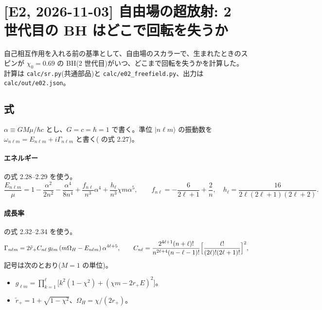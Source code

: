 \section{[E2, 2026-11-03] 自由場の超放射: 2 世代目の BH はどこで回転を失うか}\label{sec:e02}

自己相互作用を入れる前の基準として、自由場のスカラーで、生まれたときのスピンが $\chi_0=0.69$ の BH(2 世代目)がいつ、どこまで回転を失うかを計算した。計算は \texttt{calc/sr.py}(共通部品)と \texttt{calc/e02\_freefield.py}、出力は \texttt{calc/out/e02.json}。

\subsection{式}

$\alpha\equiv GM\mu/\hbar c$ とし、$G=c=\hbar=1$ で書く。準位 $|n\ell m\rangle$ の振動数を $\omega_{n\ell m}=E_{n\ell m}+i\Gamma_{n\ell m}$ と書く( の式 2.27)。

\paragraph{エネルギー}
 の式 2.28--2.29 を使う。
\begin{equation}
\frac{E_{n\ell m}}{\mu}=1-\frac{\alpha^2}{2n^2}-\frac{\alpha^4}{8n^4}+\frac{f_{n\ell}}{n^3}\alpha^4+\frac{h_\ell}{n^3}\chi m\alpha^5,
\qquad f_{n\ell}=-\frac{6}{2\ell+1}+\frac{2}{n},\quad h_\ell=\frac{16}{2\ell(2\ell+1)(2\ell+2)}.
\end{equation}

\paragraph{成長率}
 の式 2.32--2.34 を使う。
\begin{equation}
\Gamma_{n\ell m}=2\tilde r_+C_{n\ell}\,g_{\ell m}\,(m\Omega_H-E_{n\ell m})\,\alpha^{4\ell+5},
\qquad
C_{n\ell}=\frac{2^{4\ell+1}(n+\ell)!}{n^{2\ell+4}(n-\ell-1)!}\Bigl[\frac{\ell!}{(2\ell)!(2\ell+1)!}\Bigr]^2,
\label{eq:e02_rate}
\end{equation}
記号は次のとおり($M=1$ の単位)。
\begin{itemize}
\item $g_{\ell m}=\prod_{k=1}^{\ell}\bigl[k^2(1-\chi^2)+(\chi m-2r_+E)^2\bigr]$。
\item $\tilde r_+=1+\sqrt{1-\chi^2}$、$\Omega_H=\chi/(2r_+)$。
\end{itemize}


